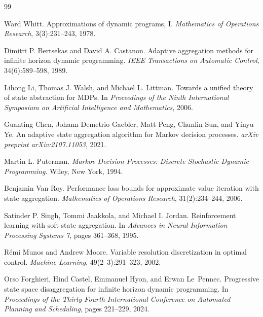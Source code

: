 \documentclass{article}
\begin{document}
\clearpage

\begin{thebibliography}{99}

Ward Whitt.
\newblock Approximations of dynamic programs, I.
\newblock \emph{Mathematics of Operations Research}, 3(3):231--243, 1978.

Dimitri P. Bertsekas and David A. Castanon.
\newblock Adaptive aggregation methods for infinite horizon dynamic
  programming.
\newblock \emph{IEEE Transactions on Automatic Control}, 34(6):589--598, 1989.

Lihong Li, Thomas J. Walsh, and Michael L. Littman.
\newblock Towards a unified theory of state abstraction for MDPs.
\newblock In \emph{Proceedings of the Ninth International Symposium on
  Artificial Intelligence and Mathematics}, 2006.

Guanting Chen, Johann Demetrio Gaebler, Matt Peng, Chunlin Sun, and Yinyu Ye.
\newblock An adaptive state aggregation algorithm for Markov decision
  processes.
\newblock \emph{arXiv preprint arXiv:2107.11053}, 2021.

Martin L. Puterman.
\newblock \emph{Markov Decision Processes: Discrete Stochastic Dynamic
  Programming}.
\newblock Wiley, New York, 1994.

Benjamin Van Roy.
\newblock Performance loss bounds for approximate value iteration with state
  aggregation.
\newblock \emph{Mathematics of Operations Research}, 31(2):234--244, 2006.

Satinder P. Singh, Tommi Jaakkola, and Michael I. Jordan.
\newblock Reinforcement learning with soft state aggregation.
\newblock In \emph{Advances in Neural Information Processing Systems 7}, pages
  361--368, 1995.

R\'emi Munos and Andrew Moore.
\newblock Variable resolution discretization in optimal control.
\newblock \emph{Machine Learning}, 49(2--3):291--323, 2002.

Orso Forghieri, Hind Castel, Emmanuel Hyon, and Erwan Le~Pennec.
\newblock Progressive state space disaggregation for infinite horizon dynamic
  programming.
\newblock In \emph{Proceedings of the Thirty-Fourth International Conference on
  Automated Planning and Scheduling}, pages 221--229, 2024.


\end{thebibliography}
\end{document}
